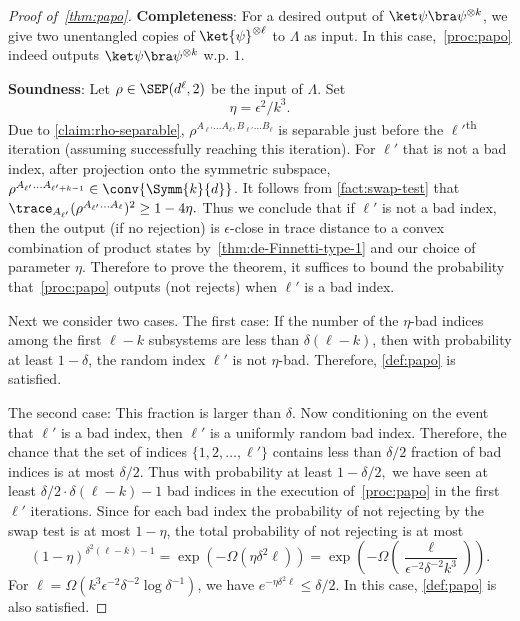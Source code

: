 \begin{proof}[Proof of~\cref{thm:papo}]
\textbf{Completeness}: For a desired output of $\ket\psi\bra\psi^{\otimes k}$, we give two unentangled copies of $\ket{\psi}^{\otimes \ell}$ to $\Lambda$ as input.
In this case,~\cref{proc:papo} indeed outputs $\ket\psi\bra\psi^{\otimes k}$ w.p. $1$.
  
\textbf{Soundness}: Let $\rho \in \SEP(d^\ell,2)$ be the input of $\Lambda$. 
Set 
\begin{equation*}
\eta= \epsilon^2 / k^3.
\end{equation*}
Due to \cref{claim:rho-separable}, $\rho^{A_{\ell'}\ldots A_\ell,B_{\ell'}\ldots B_\ell}$ is separable just before the $\ell'$\textsuperscript{th} iteration (assuming successfully reaching this iteration). 
For $\ell'$ that is not a bad index,  after projection onto the symmetric subspace, $\rho^{A_{\ell'} \ldots A_{\ell'+k-1}} \in \conv {\Symm{k}{d}} $.  It follows from \cref{fact:swap-test} that
$\trace_{A_{\ell'}}{(\rho^{A_{\ell'}\ldots A_\ell})^2}\ge 1-4\eta.$ Thus we conclude that if $\ell'$ is not a bad index, then the output (if no rejection)
is $\epsilon$-close in trace distance to a convex combination of product states by~\cref{thm:de-Finnetti-type-1} and our choice of parameter $\eta$. Therefore to prove the theorem, it suffices to bound the probability that~\cref{proc:papo} outputs (not rejects) when $\ell'$ is a bad index.

Next we consider two cases. The first case: If the number of the $\eta$-bad indices among the first $\ell-k$ subsystems are less than $\delta (\ell-k)$,
then with probability at least $1-\delta$, the random index $\ell'$ is not $\eta$-bad. 
Therefore, \cref{def:papo} is satisfied.

The second case: This fraction is larger than $\delta$. 
Now conditioning on the event that $\ell'$ is a bad index, then $\ell'$ is a uniformly random bad index. Therefore, the chance that the set of indices $\{1,2,\ldots, \ell'\}$  contains less than  $\delta/2$
fraction of bad indices is at most $\delta/2$. Thus with probability at least $1-\delta/2,$ we have
seen at least $\delta/2 \cdot \delta (\ell-k) -1$ bad indices in the execution of~\cref{proc:papo} in the first $\ell'$ iterations.
Since for each bad index the probability of not rejecting by the swap test is at most $1-\eta$,
the total probability of not rejecting is at most
\begin{equation}\label{eq:papo-delta}
    (1-\eta)^{\delta^2(\ell-k)-1} = \exp(-\Omega(\eta\delta^2\ell))=
        \exp\left(-\Omega\left(\frac{\ell}{\epsilon^{-2}\delta^{-2} k^3}\right)\right). 
\end{equation}
For 
$\ell = \Omega\left(k^3\epsilon^{-2} \delta^{-2}\log\delta^{-1}\right)$, 
we have $e^{-\eta \delta^2 \ell} \le \delta/2$. In this case, \cref{def:papo} is also satisfied.
\end{proof}  

